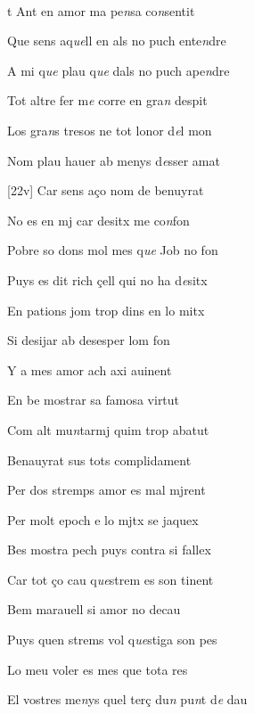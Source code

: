 \documentclass[12pt]{article}
\renewcommand{\espaiAbansEtiquetaPoema}{\vspace{0ex}}
\begin{document}
\begin{estrofa}

\espaiAbansEtiquetaPoema

\\

\end{estrofa}


\begin{estrofa}

 t Ant en amor ma pe\textit{n}sa co\textit{n}sentit

 Que sens aq\textit{ue}ll en als no puch ente\textit{n}dre

 A mi q\textit{ue} plau q\textit{ue} dals no puch ape\textit{n}dre

 Tot altre fer m\textit{e} corre en gra\textit{n} despit

 Los gra\textit{n}s tresos ne tot lonor d\textit{e}l mon

 Nom plau hauer ab menys d\textit{e}sser amat

 [22v] Car sens a\c{c}o nom de benuyrat

 No es en mj car desitx me co\textit{n}fon

\end{estrofa}



\begin{estrofa}

 Pobre so dons mol mes q\textit{ue} Job no fon

 Puys es dit rich \c{c}ell qui no ha d\textit{e}sitx

 En pations jom trop dins en lo mitx

 Si desijar ab desesper lom fon

 Y a mes amor ach axi auinent

 En be mostrar sa famosa virtut

 Com alt mu\textit{n}tarmj quim trop abatut

 Benauyrat sus tots complidament

\end{estrofa}



\begin{estrofa}

 Per dos stremps amor es mal mjrent

 Per molt epoch e lo mjtx se jaquex

 Bes mostra pech puys contra si fallex

 Car tot \c{c}o cau q\textit{ue}strem es son tinent

 Bem marauell si amor no decau

 Puys quen strems vol q\textit{ue}stiga son pes

 Lo meu voler es mes que tota res

 El vostres me\textit{n}ys quel ter\c{c} du\textit{n} pu\textit{n}t d\textit{e}
dau

\end{estrofa}
\end{document}
